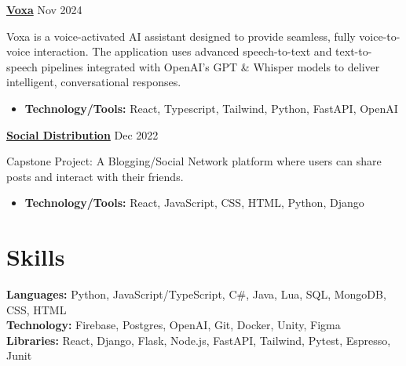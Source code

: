\documentclass[letterpaper, 10pt]{article}
\newcommand{\secStartSpace}{\vspace{3pt}}
\newcommand{\secEndSpace}{\vspace{5pt}}
\newcommand{\spaceCollapse}{\vspace{-2pt}}
\newcommand{\projectHeader}[3]{
\noindent\href{#2}{\large\textbf{#1}} \hfill \normalsize#3 \vspace{2pt}
}
\begin{document}
\begin{addmargin}[0.5em]{1em}

		
	 \projectHeader{Voxa}{https://github.com/mateopaez/voxa}{Nov 2024}

	\noindent Voxa is a voice-activated AI assistant designed to provide seamless, fully voice-to-voice interaction. The application uses advanced speech-to-text and text-to-speech pipelines integrated with OpenAI's GPT \& Whisper models to deliver intelligent, conversational responses.
	\spaceCollapse
	\begin{itemize}
		\item \textbf{Technology/Tools:} React, Typescript, Tailwind, Python, FastAPI, OpenAI
	\end{itemize}
 
	\noindent {} \projectHeader{Social Distribution}{https://github.com/CMPUT404-Fall22-Project/Group-Project}{Dec 2022}
		
	\noindent Capstone Project: A Blogging/Social Network platform where users can share posts and interact with their friends.
	\spaceCollapse
	\begin{itemize}
		\item \textbf{Technology/Tools:} React, JavaScript, CSS, HTML, Python, Django
	\end{itemize}
\end{addmargin}
\secEndSpace
\secEndSpace



\section{\color{blue} \textbf{Skills}}
\secStartSpace

\begin{addmargin}[0.5em]{1em}
	\noindent \textbf{Languages:} Python, JavaScript/TypeScript, C\#, Java, Lua, SQL, MongoDB, CSS, HTML \\
	\noindent \textbf{Technology:} Firebase, Postgres, OpenAI, Git, Docker, Unity, Figma \\
	\noindent \textbf{Libraries:} React, Django, Flask, Node.js, FastAPI, Tailwind, Pytest, Espresso, Junit
\end{addmargin}
\secEndSpace
\secEndSpace
\end{document}
